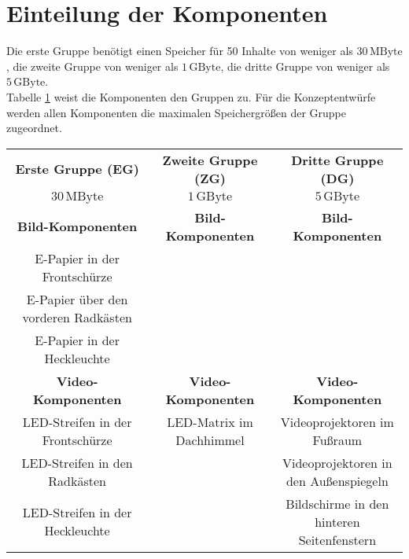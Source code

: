 \section{Einteilung der Komponenten}
Die erste Gruppe benötigt einen Speicher für 50 Inhalte von weniger als $ 30\,\mathrm{MByte} $, die zweite Gruppe von weniger als $ 1\,\mathrm{GByte} $, die dritte Gruppe von weniger als $ 5\,\mathrm{GByte} $. \\
Tabelle \ref{tab:Einteilung} weist die Komponenten den Gruppen zu. Für die Konzeptentwürfe werden allen Komponenten die maximalen Speichergrößen der Gruppe zugeordnet. 
\\
\begin{table}[hbt]	
	\centering
	\renewcommand{\arraystretch}{1.5}	%
	\label{tab:Einteilung}
	\begin{tabular}{c|c|c}
		\textbf{Erste Gruppe (EG\nomenclature{EG}{Erste Gruppe})} & \textbf{Zweite Gruppe (ZG\nomenclature{ZG}{Zweite Gruppe})} & \textbf{Dritte Gruppe (DG\nomenclature{DG}{Dritte Gruppe})} \\ 
		$ 30\,\mathrm{MByte} $ & $ 1\,\mathrm{GByte} $ & $ 5\,\mathrm{GByte} $ \\
		\hline
		\hline
		\textbf{Bild-Komponenten} & \textbf{Bild-Komponenten} & \textbf{Bild-Komponenten} \\
		\parbox[t]{0.3\linewidth}{\centering E-Papier in der Frontschürze} &  &  \\
		\parbox[t]{0.3\linewidth}{\centering E-Papier über den vorderen Radkästen} &  & \\
		\parbox[t]{0.3\linewidth}{\centering E-Papier in der Heckleuchte} &  &  \\
		\textbf{Video-Komponenten} & \textbf{Video-Komponenten} & \textbf{Video-Komponenten} \\
		\parbox[t]{0.3\linewidth}{\centering LED-Streifen in der Frontschürze} & \parbox[t]{0.3\linewidth}{\centering LED-Matrix im Dachhimmel} & \parbox[t]{0.3\linewidth}{\centering Videoprojektoren im Fußraum} \\
		\parbox[t]{0.3\linewidth}{\centering LED-Streifen in den Radkästen} &  & \parbox[t]{0.3\linewidth}{\centering Videoprojektoren in\\den Außenspiegeln} \\ 
		\parbox[t]{0.3\linewidth}{\centering LED-Streifen in der Heckleuchte} &  & \parbox[t]{0.3\linewidth}{\centering Bildschirme in den\\hinteren Seitenfenstern} \\ 

\end{tabular}
\end{table}
